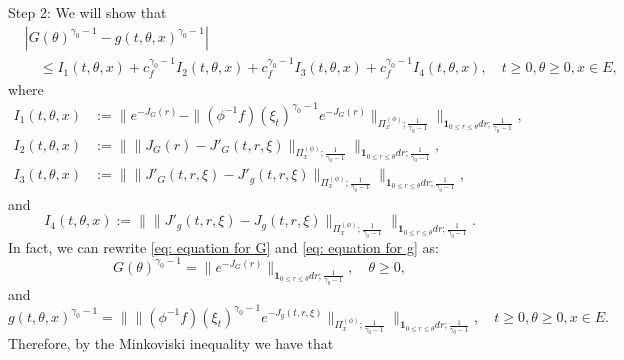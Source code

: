 \documentclass[12pt, a4paper]{amsart}
\theoremstyle{definition}
\numberwithin{equation}{section}
\begin{document}
	Step 2: We will show that
\[\begin{split}
	&|  G(\theta)^{\gamma_0 - 1} - g(t,\theta,x)^{\gamma_0 - 1} |
	\\&\quad \leq I_1(t,\theta,x) +c^{\gamma_0 - 1}_f I_2(t,\theta,x) +c^{\gamma_0 - 1}_f I_3(t,\theta,x) + c^{\gamma_0 - 1}_f I_4(t,\theta,x),
	\quad t\geq 0, \theta \geq 0, x\in E,
\end{split}\]
	where
\[\begin{split}
	I_1(t,\theta,x)
	&:= \big\| e^{ - J_G(r)} - \| (\phi^{-1}f)(\xi_t)^{\gamma_0 - 1} e^{-J_G(r)} \|_{\Pi_x^{(\phi)};\frac{1}{\gamma_0 - 1}} \big\|_{\mathbf 1_{0\leq r\leq \theta} dr;\frac{1}{\gamma_0 - 1}} ,
	\\I_2(t,\theta,x)
	&:= \big\|  \|  J_G(r) - J'_G(t,r,\xi)  \|_{\Pi_x^{(\phi)};\frac{1}{\gamma_0 - 1}} \big\|_{\mathbf 1_{0\leq r\leq \theta} dr;\frac{1}{\gamma_0 - 1}},
	\\I_3(t,\theta,x)
	&:= \big\| \|  J'_G(t,r,\xi) - J'_g(t,r,\xi)  \|_{\Pi_x^{(\phi)};\frac{1}{\gamma_0 - 1}} \big\|_{\mathbf 1_{0\leq r\leq \theta} dr;\frac{1}{\gamma_0 - 1}},
\end{split}\]
	and
\[
	I_4(t,\theta,x)
	:= \big\| \| J'_g(t,r,\xi) - J_g(t,r,\xi)  \|_{\Pi_x^{(\phi)};\frac{1}{\gamma_0 - 1}} \big\|_{\mathbf 1_{0\leq r\leq \theta} dr;\frac{1}{\gamma_0 - 1}}.
\]
	In fact, we can rewrite \eqref{eq: equation for G} and \eqref{eq: equation for g} as:
\[
	G(\theta)^{\gamma_0 - 1} =
	\| e^{ - J_G(r)} \|_{\mathbf 1_{0\leq r\leq \theta} dr;\frac{1}{\gamma_0 - 1}},
	\quad \theta \geq 0,
\]	
	and
\[
	g(t,\theta,x)^{\gamma_0 - 1}
	=\big\| \| (\phi^{-1}f)(\xi_t) ^{\gamma_0 - 1} e^{-J_g(t,r,\xi)} \|_{\Pi_x^{(\phi)};\frac{1}{\gamma_0 - 1}} \big\|_{\mathbf 1_{0\leq r\leq \theta} dr;\frac{1}{\gamma_0 - 1}},
	\quad t\geq 0, \theta \geq 0, x\in E.
\]
	Therefore, by the Minkoviski inequality we have that
\end{document}
